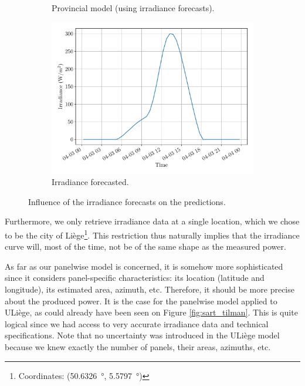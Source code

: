 \documentclass[a4paper, 12pt]{article}
\begin{document}
\begin{figure}[H]
\begin{subfigure}{0.48\textwidth}
		\caption{Provincial model (using irradiance forecasts).}
	\end{subfigure}
	\hspace{0.5em}
	\begin{subfigure}{0.48\textwidth}
		\centering
		\includegraphics[width=\textwidth]{resources/pdf/irradiance_for_for_START_FOR_03-04-2020.pdf}
		\vspace{-0.5em}
		\caption{Irradiance forecasted.}
	\end{subfigure}
	\caption{Influence of the irradiance forecasts on the predictions.}
	\label{fig:irradiance_for_influence}
\end{figure}


Furthermore, we only retrieve irradiance data at a single location, which we chose to be the city of Liège\footnote{Coordinates: (\SI{50.6326}{\degree}, \SI{5.5797}{\degree})}. This restriction thus naturally implies that the irradiance curve will, most of the time, not be of the same shape as the measured power.

As far as our panelwise model is concerned, it is somehow more sophisticated since it considers panel-specific characteristics: its location (latitude and longitude), its estimated area, azimuth, etc. Therefore, it should be more precise about the produced power. It is the case for the panelwise model applied to ULiège, as could already have been seen on Figure \ref{fig:sart_tilman}. This is quite logical since we had access to very accurate irradiance data and technical specifications. Note that no uncertainty was introduced in the ULiège model because we knew exactly the number of panels, their areas, azimuths, etc. 
\end{document}

